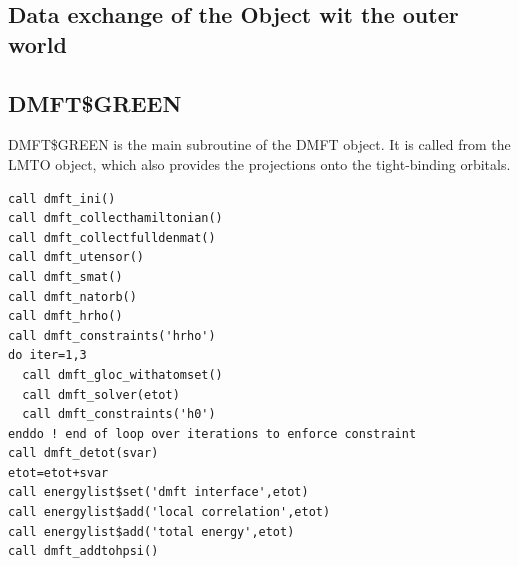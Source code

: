 \documentclass[11pt,a4paper]{report}
\begin{document}
\subsection{Data exchange of the Object wit the outer world}


\subsection{DMFT\$GREEN}
DMFT\$GREEN is the main subroutine of the DMFT object. It is called
from the LMTO object, which also provides the  projections onto the
tight-binding orbitals.

\begin{verbatim}
call dmft_ini()
call dmft_collecthamiltonian()  
call dmft_collectfulldenmat()  
call dmft_utensor() 
call dmft_smat()
call dmft_natorb()
call dmft_hrho()
call dmft_constraints('hrho')
do iter=1,3
  call dmft_gloc_withatomset() 
  call dmft_solver(etot) 
  call dmft_constraints('h0')
enddo ! end of loop over iterations to enforce constraint
call dmft_detot(svar)
etot=etot+svar      
call energylist$set('dmft interface',etot)
call energylist$add('local correlation',etot)
call energylist$add('total energy',etot)
call dmft_addtohpsi()
\end{verbatim}
\end{document}
